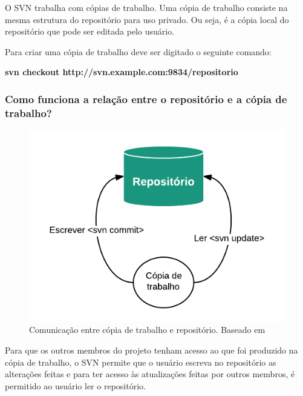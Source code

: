 O SVN trabalha com cópias de trabalho. Uma cópia de trabalho consiste na mesma estrutura do repositório para uso privado. Ou seja, é a cópia local do repositório que pode ser editada pelo usuário. 

Para criar uma cópia de trabalho deve ser digitado o seguinte comando: 


\begin{centering}
\colorbox{PineGreen}{
\begin{minipage}{320px}
  \textbf{svn checkout http://svn.example.com:9834/repositorio}
\end{minipage}
}

\end{centering}

\subsubsection{Como funciona a relação entre o repositório e a cópia de trabalho?}

\begin{figure}[!htb]
\centering
\includegraphics[scale=1]{figuras/repositorio_copia.png}
\caption{Comunicação entre cópia de trabalho e repositório. Baseado em \cite{svn-book}}
\end{figure}


Para que os outros membros do projeto tenham acesso ao que foi produzido na cópia de trabalho, o SVN permite que o usuário escreva no repositório as alterações feitas
e para ter acesso às atualizações feitas por outros membros, é permitido ao usuário ler o repositório. \cite{svn-book}


